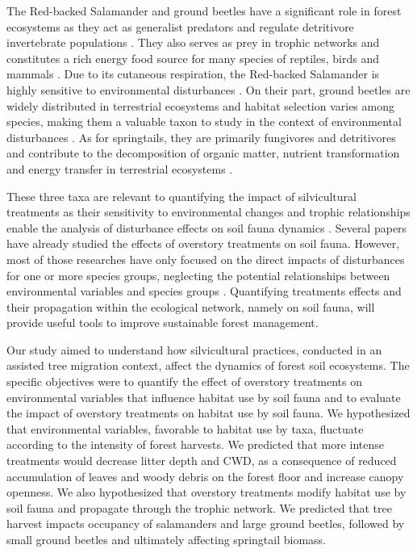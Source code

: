 The Red-backed Salamander and ground beetles have a significant role in forest ecosystems as they act as generalist predators and regulate detritivore invertebrate populations \citep{Burton1975Energyflow,loveiEcologyBehaviorGround1996,Walton2013Topdownregulation,Hickerson2017Easternredbacked}. 
They also serves as prey in trophic networks and constitutes a rich energy food source for many species of reptiles, birds and mammals \citep{Burton1975Energyflow,Pough1987abundancesalamanders,loveiEcologyBehaviorGround1996}. 
Due to its cutaneous respiration, the Red-backed Salamander is highly sensitive to environmental disturbances \citep{Welsh2001caseusing}.
On their part, ground beetles are widely distributed in terrestrial ecosystems and habitat selection varies among species, making them a valuable taxon to study in the context of environmental disturbances \citep{Luff1992Classificationprediction,Larochelle2003naturalhistory,Work2008Evaluationcarabid,bouchardBeetleCommunityResponse2016b}. 
As for springtails, they are primarily fungivores and detritivores and contribute to the decomposition of organic matter, nutrient transformation and energy transfer in terrestrial ecosystems \citep{rusekBiodiversityCollembolaTheir1998,Hattenschwiler2005Biodiversitylitter,Cuchta2019importantrole,Marsden2020Howagroforestry}.

These three taxa are relevant to quantifying the impact of silvicultural treatments as their sensitivity to environmental changes and trophic relationships enable the analysis of disturbance effects on soil fauna dynamics \citep{Salmon2008Relationshipssoil}.
Several papers have already studied the effects of overstory treatments on soil fauna.
However, most of those researches have only focused on the direct impacts of disturbances for one or more species groups, neglecting the potential relationships between environmental variables and species groups \citep{josephIntegratingOccupancyModels2016,Pollierer2021Diversityfunctional,Kudrin2023metaanalysiseffects}. 
Quantifying treatments effects and their propagation within the ecological network, namely on soil fauna, will provide useful tools to improve sustainable forest management.

Our study aimed to understand how silvicultural practices, conducted in an assisted tree migration context, affect the dynamics of forest soil ecosystems. 
The specific objectives were to quantify the effect of overstory treatments on environmental variables that influence habitat use by soil fauna
and to evaluate the impact of overstory treatments on habitat use by soil fauna.
We hypothesized that environmental variables, favorable to habitat use by taxa, fluctuate according to the intensity of forest harvests. 
We predicted that more intense treatments would decrease litter depth and CWD, as a consequence of reduced accumulation of leaves and woody debris on the forest floor and increase canopy openness. 
We also hypothesized that overstory treatments modify habitat use by soil fauna and propagate through the trophic network. 
We predicted that tree harvest impacts occupancy of salamanders and large ground beetles, 
followed by small ground beetles and ultimately affecting springtail biomass. 


